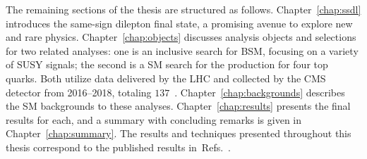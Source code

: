 The remaining sections of the thesis are structured as follows.
Chapter~\ref{chap:ssdl} introduces the same-sign dilepton final state,
a promising avenue to explore new and rare physics. 
Chapter~\ref{chap:objects} discusses analysis
objects and selections for two related analyses: one is an inclusive search
for BSM, focusing on a variety of SUSY signals; the second is a SM search for the production
for four top quarks. Both utilize data delivered by the LHC
and collected by the CMS detector from 2016--2018, totaling $137$~\fbinv. 
Chapter~\ref{chap:backgrounds} describes the
SM backgrounds to these analyses. Chapter~\ref{chap:results} presents the
final results for each, and a summary with concluding remarks is given in
Chapter~\ref{chap:summary}. The results and techniques presented throughout
this thesis correspond to the published results 
in~Refs.~\cite{CMS:myTOPRun2,CMS:mySUSRun2PAS,CMS:myTOP2016,CMS:mySUS2016}.
